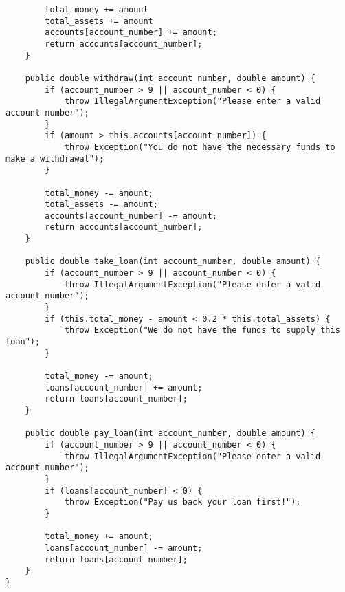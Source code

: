 \begin{parts}
\begin{solution}
\begin{lstlisting}
        total_money += amount
        total_assets += amount
        accounts[account_number] += amount;
        return accounts[account_number];
    }

    public double withdraw(int account_number, double amount) {
        if (account_number > 9 || account_number < 0) {
            throw IllegalArgumentException("Please enter a valid account number");
        }
        if (amount > this.accounts[account_number]) {
            throw Exception("You do not have the necessary funds to make a withdrawal");
        }
        
        total_money -= amount;
        total_assets -= amount;
        accounts[account_number] -= amount;
        return accounts[account_number];
    }

    public double take_loan(int account_number, double amount) {
        if (account_number > 9 || account_number < 0) {
            throw IllegalArgumentException("Please enter a valid account number");
        }
        if (this.total_money - amount < 0.2 * this.total_assets) {
            throw Exception("We do not have the funds to supply this loan");
        }
        
        total_money -= amount;
        loans[account_number] += amount;
        return loans[account_number];
    }

    public double pay_loan(int account_number, double amount) {
        if (account_number > 9 || account_number < 0) {
            throw IllegalArgumentException("Please enter a valid account number");
        }
        if (loans[account_number] < 0) {
            throw Exception("Pay us back your loan first!");
        }
        
        total_money += amount;
        loans[account_number] -= amount;
        return loans[account_number];
    }
}

\end{lstlisting}
\end{solution}
    
\end{parts}

